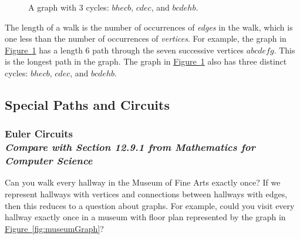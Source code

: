 \documentclass[11pt,oneside]{book}
\theoremstyle{definition}
\begin{document}
\begin{figure}[H]
  \centering
  \caption{A graph with 3 cycles: $bhecb$, $cdec$, and $bcdehb$.}
  \label{fig:graphWith3Cycles}
\end{figure}

The length of a walk is the number of occurrences of \emph{edges} in the walk, which is one less than the number of occurrences of \emph{vertices}.
For example, the graph in \hyperref[fig:graphWith3Cycles]{Figure~\ref*{fig:graphWith3Cycles}} has a length 6 path through the seven successive vertices $abcdefg$.
This is the longest path in the graph.
The graph in \hyperref[fig:graphWith3Cycles]{Figure~\ref*{fig:graphWith3Cycles}} also has three distinct cycles: $bhecb$, $cdec$, and $bcdehb$.


\subsection{Special Paths and Circuits}
\subsubsection[Euler Circuits]{Euler Circuits\\[0.5ex]
\normalsize\normalfont\textit{
    Compare with Section 12.9.1 from \emph{Mathematics for Computer Science}
}}
Can you walk every hallway in the Museum of Fine Arts exactly once?
If we represent hallways with vertices and connections between hallways with edges, then this reduces to a question about graphs.
For example, could you visit every hallway exactly once in a museum with floor plan represented by the graph in \hyperref[fig:museumGraph]{Figure~\ref*{fig:museumGraph}}?
\end{document}
